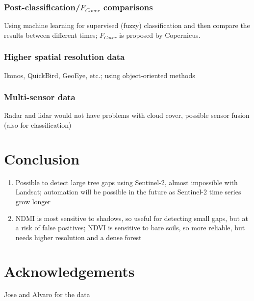 \documentclass[a4paper,12pt]{scrbook}
\begin{document}
\subsection{Post-classification/$F_{Cover}$ comparisons}

Using machine learning for supervised (fuzzy) classification and then compare the results between different times; $F_{Cover}$ is proposed by Copernicus.

\subsection{Higher spatial resolution data}

Ikonos, QuickBird, GeoEye, etc.; using object-oriented methods

\subsection{Multi-sensor data}

Radar and lidar would not have problems with cloud cover, possible sensor fusion (also for classification)

\chapter{Conclusion}

\begin{enumerate}
 \item Possible to detect large tree gaps using Sentinel-2, almost impossible with Landsat; automation will be possible in the future as Sentinel-2 time series grow longer
 \item \ac{NDMI} is most sensitive to shadows, so useful for detecting small gaps, but at a risk of false positives; \ac{NDVI} is sensitive to bare soils, so more reliable, but needs higher resolution and a dense forest
\end{enumerate}

\chapter{Acknowledgements}

Jose and Alvaro for the data

\printnoidxglossary[type=acronym]


\end{document}

